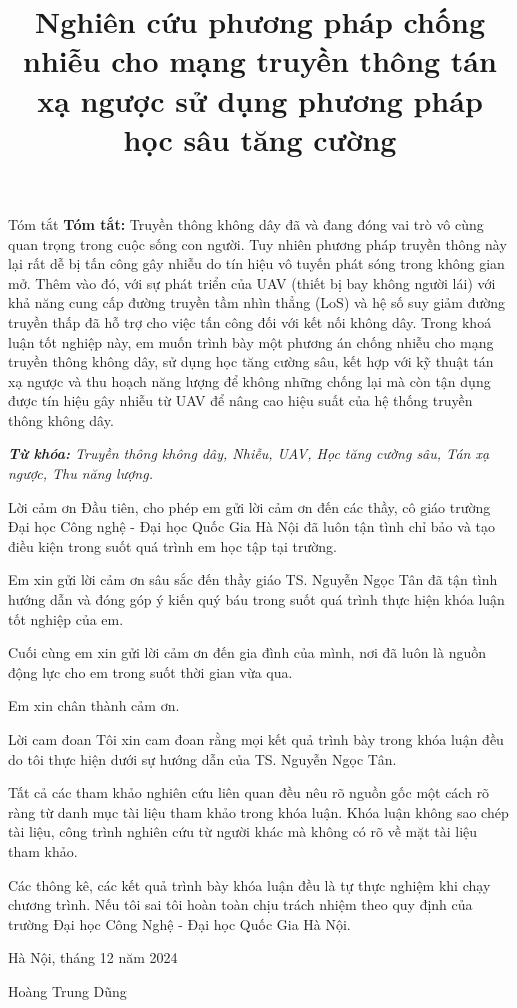 \documentclass{uetgraduation}
\begin{document}
\title{Nghiên cứu phương pháp chống nhiễu cho mạng truyền thông tán xạ ngược sử dụng phương pháp học sâu tăng cường}
\makecovers
\begin{preamble}{Tóm tắt}
\textbf{Tóm tắt:} Truyền thông không dây đã và đang đóng vai trò vô cùng quan trọng trong cuộc sống con người. Tuy
nhiên phương pháp truyền thông này lại rất dễ bị tấn công gây nhiễu do tín hiệu vô tuyến phát sóng trong không gian mở.
Thêm vào đó, với sự phát triển của UAV (thiết bị bay không người lái) với khả năng cung cấp đường truyền tầm nhìn thẳng
(LoS) và hệ số suy giảm đường truyền thấp đã hỗ trợ cho việc tấn công đối với kết nối không dây. Trong khoá luận tốt nghiệp
này, em muốn trình bày một phương án chống nhiễu cho mạng truyền thông không dây, sử dụng học tăng cường sâu, kết hợp với
kỹ thuật tán xạ ngược và thu hoạch năng lượng để không những chống lại mà còn tận dụng được tín hiệu gây nhiễu từ UAV 
để nâng cao hiệu suất của hệ thống truyền thông không dây.

\textit{\textbf{Từ khóa:} Truyền thông không dây, Nhiễu, UAV, Học tăng cường sâu, Tán xạ ngược, Thu năng lượng.}
\end{preamble}
\begin{preamble}{Lời cảm ơn}
    Đầu tiên, cho phép em gửi lời cảm ơn đến các thầy, cô giáo trường Đại học Công nghệ - Đại học
    Quốc Gia Hà Nội đã luôn tận tình chỉ bảo và tạo điều kiện trong suốt quá trình em học
    tập tại trường.
    
    Em xin gửi lời cảm ơn sâu sắc đến thầy giáo TS. Nguyễn Ngọc Tân đã tận tình
    hướng dẫn và đóng góp ý kiến quý báu trong suốt quá trình thực hiện khóa luận tốt
    nghiệp của em.
    
    Cuối cùng em xin gửi lời cảm ơn đến gia đình của mình, nơi đã luôn là nguồn động lực cho em
    trong suốt thời gian vừa qua.
    
    Em xin chân thành cảm ơn.
\end{preamble}
\begin{preamble}{Lời cam đoan}
Tôi xin cam đoan rằng mọi kết quả trình bày trong khóa luận đều do tôi thực hiện
dưới sự hướng dẫn của TS. Nguyễn Ngọc Tân.

Tất cả các tham khảo nghiên cứu liên quan đều nêu rõ nguồn gốc một cách rõ ràng từ 
danh mục tài liệu tham khảo trong khóa luận. Khóa luận không sao chép tài liệu, 
công trình nghiên cứu từ người khác mà không có rõ về mặt tài liệu tham khảo.

Các thông kê, các kết quả trình bày khóa luận đều là tự thực nghiệm khi chạy chương trình. Nếu tôi sai 
tôi hoàn toàn chịu trách nhiệm theo quy định của trường Đại học Công Nghệ - Đại học Quốc Gia Hà Nội.

\begin{flushright}
    Hà Nội, tháng 12 năm 2024

    \vspace{45pt}
    Hoàng Trung Dũng
\end{flushright}
\end{preamble}
\end{document}
